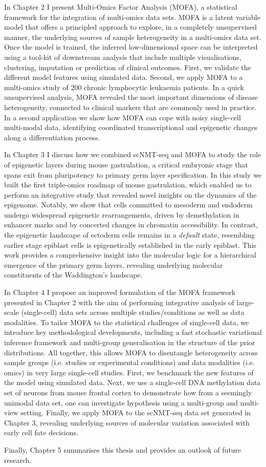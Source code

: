In Chapter 2 I present Multi-Omics Factor Analysis (MOFA), a statistical framework for the integration of multi-omics data sets. MOFA is a latent variable model that offers a principled approach to explore, in a completely unsupervised manner, the underlying sources of sample heterogeneity in a multi-omics data set. Once the model is trained, the inferred low-dimensional space can be interpreted using a tool-kit of downstream analysis that include multiple visualisations, clustering, imputation or prediction of clinical outcomes. First, we validate the different model features using simulated data. Second, we apply MOFA to a multi-omics study of 200 chronic lymphocytic leukaemia patients. In a quick unsupervised analysis, MOFA revealed the most important dimensions of disease heterogeneity, connected to clinical markers that are commonly used in practice. In a second application we show how MOFA can cope with noisy single-cell multi-modal data, identifying coordinated transcriptional and epigenetic changes along a differentiation process.

In Chapter 3 I discuss how we combined scNMT-seq and MOFA to study the role of epigenetic layers during mouse gastrulation, a critical embryonic stage that spans exit from pluripotency to primary germ layer specification. In this study we built the first triple-omics roadmap of mouse gastrulation, which enabled us to perform an integrative study that revealed novel insights on the dynamics of the epigenome. Notably, we show that cells committed to mesoderm and endoderm undergo widespread epigenetic rearrangements, driven by demethylation in enhancer marks and by concerted changes in chromatin accessibility. In contrast, the epigenetic landscape of ectoderm cells remains in a \textit{default} state, resembling earlier stage epiblast cells is epigenetically established in the early epiblast. This work provides a comprehensive insight into the molecular logic for a hierarchical emergence of the primary germ layers, revealing underlying molecular constituents of the Waddington's landscape.

In Chapter 4 I propose an improved formulation of the MOFA framework presented in Chapter 2 with the aim of performing integrative analysis of large-scale (single-cell) data sets across multiple studies/conditions as well as data modalities. To tailor MOFA to the statistical challenges of single-cell data, we introduce key methodological developments, including a fast stochastic variational inference framework and multi-group generalisation in the structure of the prior distributions. All together, this allows MOFA to  disentangle heterogeneity across sample groups (i.e. studies or experimental conditions) and data modalities (i.e. omics) in very large single-cell studies. First, we benchmark the new features of the model using simulated data. Next, we use a single-cell DNA methylation data set of neurons from mouse frontal cortex to demonstrate how from a seemingly unimodal data set, one can investigate hypothesis using a multi-group and multi-view setting. Finally, we apply MOFA to the scNMT-seq data set generated in Chapter 3, revealing underlying sources of molecular variation associated with early cell fate decisions.

Finally, Chapter 5 summarises this thesis and provides an outlook of future research.